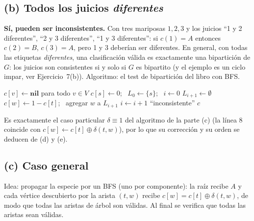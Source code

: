 \subsection*{(b) Todos los juicios \emph{diferentes}}
\textbf{Sí, pueden ser inconsistentes.} Con tres mariposas $1,2,3$ y los juicios ``1 y 2 diferentes'',
``2 y 3 diferentes'', ``1 y 3 diferentes'': si $c(1)=A$ entonces $c(2)=B$, $c(3)=A$, pero 1 y 3 deberían
ser diferentes. En general, con todas las etiquetas \emph{diferentes}, una clasificación válida es
exactamente una bipartición de $G$: los juicios son consistentes si y solo si $G$ es bipartito (y el
ejemplo es un ciclo impar, ver Ejercicio~7(b)). Algoritmo: el test de bipartición del libro con BFS.

\begin{algorithm}[H]
\caption{Juicios todos \emph{diferentes}: test de bipartición con BFS}
\begin{algorithmic}[1]
  \State $c[v]\gets\textbf{nil}$ para todo $v\in V$
   
    \State $c[s]\gets 0$; \ $L_0\gets\{s\}$; \ $i\gets0$
      \State $L_{i+1}\gets\emptyset$
        \State $c[w]\gets 1-c[t]$; \ agregar $w$ a $L_{i+1}$ 
      \EndFor
      \State $i\gets i+1$
    \EndWhile
  \EndFor
     \State \Return ``inconsistente'' \EndIf
  \EndFor
  \State \Return $c$ 
\EndFunction
\end{algorithmic}
\end{algorithm}
Es exactamente el caso particular $\delta\equiv1$ del algoritmo de la parte (c) (la línea 8 coincide con
$c[w]\gets c[t]\oplus\delta(t,w)$), por lo que su corrección y su orden se deducen de (d) y (e).

\subsection*{(c) Caso general}
Idea: propagar la especie por un BFS (uno por componente): la raíz recibe $A$ y cada vértice
descubierto por la arista $(t,w)$ recibe $c[w]=c[t]\oplus\delta(t,w)$, de modo que todas las aristas de
árbol son válidas. Al final se verifica que todas las aristas sean válidas.

